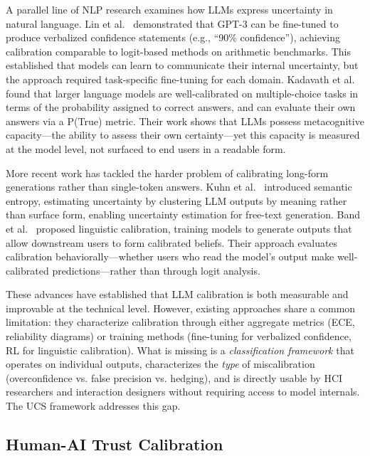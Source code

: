 \documentclass[manuscript, review, anonymous]{acmart}
\begin{document}
A parallel line of NLP research examines how LLMs express uncertainty in natural language. Lin et al.~\cite{lin2022teaching} demonstrated that GPT-3 can be fine-tuned to produce verbalized confidence statements (e.g., ``90\% confidence''), achieving calibration comparable to logit-based methods on arithmetic benchmarks. This established that models can learn to communicate their internal uncertainty, but the approach required task-specific fine-tuning for each domain. Kadavath et al.~\cite{kadavath2022language} found that larger language models are well-calibrated on multiple-choice tasks in terms of the probability assigned to correct answers, and can evaluate their own answers via a P(True) metric. Their work shows that LLMs possess metacognitive capacity---the ability to assess their own certainty---yet this capacity is measured at the model level, not surfaced to end users in a readable form.

More recent work has tackled the harder problem of calibrating long-form generations rather than single-token answers. Kuhn et al.~\cite{kuhn2023semantic} introduced semantic entropy, estimating uncertainty by clustering LLM outputs by meaning rather than surface form, enabling uncertainty estimation for free-text generation. Band et al.~\cite{band2024linguistic} proposed linguistic calibration, training models to generate outputs that allow downstream users to form calibrated beliefs. Their approach evaluates calibration behaviorally---whether users who read the model's output make well-calibrated predictions---rather than through logit analysis.

These advances have established that LLM calibration is both measurable and improvable at the technical level. However, existing approaches share a common limitation: they characterize calibration through either aggregate metrics (ECE, reliability diagrams) or training methods (fine-tuning for verbalized confidence, RL for linguistic calibration). What is missing is a \emph{classification framework} that operates on individual outputs, characterizes the \emph{type} of miscalibration (overconfidence vs. false precision vs. hedging), and is directly usable by HCI researchers and interaction designers without requiring access to model internals. The UCS framework addresses this gap.

\subsection{Human-AI Trust Calibration}
\end{document}
